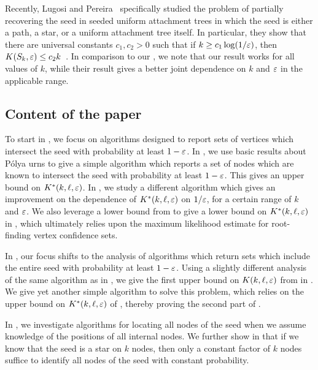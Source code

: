 Recently, Lugosi and Pereira~\cite{gabor} specifically studied the
problem of partially recovering the seed in seeded uniform attachment
trees in which the seed is either a path, a star, or a uniform
attachment tree itself. In particular, they show that there are
universal constants $c_1, c_2 > 0$ such that if
$k \ge c_1 \log (1/\varepsilon)$, then
$K(S_k, \varepsilon) \le c_2 k$~\cite[Theorem~3]{gabor}. In comparison to our
, we note that our result works for all
values of $k$, while their result gives a better joint dependence on
$k$ and $\varepsilon$ in the applicable range.


\subsection{Content of the paper}

To start in , we focus on algorithms designed to report
sets of vertices which intersect the seed with probability at least
$1 - \varepsilon$. In , we use basic results about
P\'{o}lya urns to give a simple algorithm which reports a set of nodes
which are known to intersect the seed with probability at least
$1 - \varepsilon$. This gives an upper bound on $K^*(k, \ell, \varepsilon)$. In
, we study a different algorithm which gives an
improvement on the dependence of $K^*(k, \ell, \varepsilon)$ on $1/\varepsilon$, for
a certain range of $k$ and $\varepsilon$. We also leverage a lower bound from
\cite{finding-adam} to give a lower bound on $K^*(k, \ell, \varepsilon)$ in
, which ultimately relies upon the maximum
likelihood estimate for root-finding vertex confidence sets.

In , our focus shifts to the analysis of algorithms
which return sets which include the entire seed with probability at
least $1 - \varepsilon$. Using a slightly different analysis of the same
algorithm as in , we give the first upper bound on
$K(k, \ell, \varepsilon)$ from  in
. We give yet another simple algorithm to solve
this problem, which relies on the upper bound on $K^*(k, \ell, \varepsilon)$
of , thereby proving the second part of
.

In , we investigate algorithms for locating all nodes
of the seed when we assume knowledge of the positions of all internal
nodes. We further show in  that if we know that the
seed is a star on $k$ nodes, then only a constant factor of $k$ nodes
suffice to identify all nodes of the seed with constant probability.


